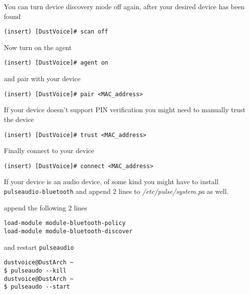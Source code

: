 \documentclass[9pt]{report}
\newenvironment{NOTE}
{\begin{tcolorbox}[colback=admonitionBG,coltitle=draculaFG,colframe=draculaBlue,colbacktitle=draculaBlue,title=NOTE]}
{\end{tcolorbox}}
\begin{document}
\begin{NOTE}
    You can turn device discovery mode off again, after your desired device has been found


    \begin{verbatim}
(insert) [DustVoice]# scan off
    \end{verbatim}
\end{NOTE}

Now turn on the agent


\begin{verbatim}
(insert) [DustVoice]# agent on
\end{verbatim}

and pair with your device


\begin{verbatim}
(insert) [DustVoice]# pair <MAC_address>
\end{verbatim}

\begin{NOTE}
    If your device doesn’t support PIN verification you might need to manually trust the device


    \begin{verbatim}
(insert) [DustVoice]# trust <MAC_address>
    \end{verbatim}
\end{NOTE}

Finally connect to your device


\begin{verbatim}
(insert) [DustVoice]# connect <MAC_address>
\end{verbatim}

\begin{NOTE}
    If your device is an audio device, of some kind you might have to install \texttt{pulseaudio-bluetooth} and append 2 lines to \textit{/etc/pulse/system.pa} as well.


    append the following 2 lines


    \begin{verbatim}
load-module module-bluetooth-policy
load-module module-bluetooth-discover
    \end{verbatim}

    and restart \texttt{pulseaudio}

    \begin{verbatim}
dustvoice@DustArch ~
$ pulseaudo --kill
dustvoice@DustArch ~
$ pulseaudo --start
    \end{verbatim}
\end{NOTE}
\end{document}
